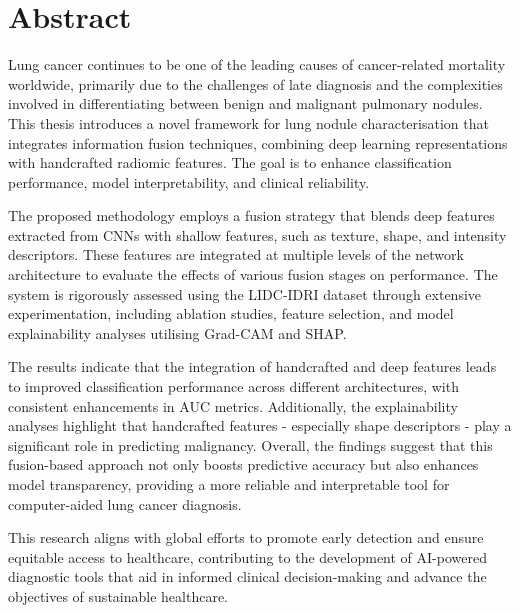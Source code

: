 \chapter*{Abstract}
Lung cancer continues to be one of the leading causes of cancer-related mortality worldwide, primarily due to the challenges of late diagnosis and the complexities involved in differentiating between benign and malignant pulmonary nodules. This thesis introduces a novel framework for lung nodule characterisation that integrates information fusion techniques, combining deep learning representations with handcrafted radiomic features. The goal is to enhance classification performance, model interpretability, and clinical reliability.

The proposed methodology employs a fusion strategy that blends deep features extracted from CNNs with shallow features, such as texture, shape, and intensity descriptors. These features are integrated at multiple levels of the network architecture to evaluate the effects of various fusion stages on performance. The system is rigorously assessed using the LIDC-IDRI dataset through extensive experimentation, including ablation studies, feature selection, and model explainability analyses utilising Grad-CAM and SHAP.

The results indicate that the integration of handcrafted and deep features leads to improved classification performance across different architectures, with consistent enhancements in AUC metrics. Additionally, the explainability analyses highlight that handcrafted features - especially shape descriptors - play a significant role in predicting malignancy. Overall, the findings suggest that this fusion-based approach not only boosts predictive accuracy but also enhances model transparency, providing a more reliable and interpretable tool for computer-aided lung cancer diagnosis.

This research aligns with global efforts to promote early detection and ensure equitable access to healthcare, contributing to the development of AI-powered diagnostic tools that aid in informed clinical decision-making and advance the objectives of sustainable healthcare.